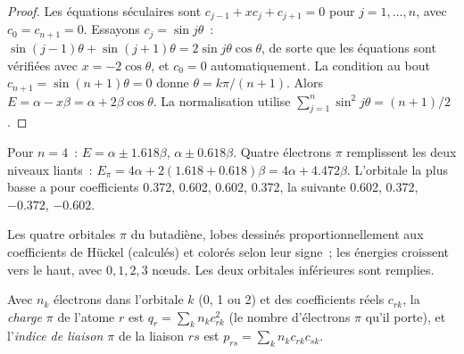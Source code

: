 \begin{proof}
Les équations séculaires sont $c_{j-1} + xc_j + c_{j+1} = 0$ pour $j = 1, \dots, n$, avec
$c_0 = c_{n+1} = 0$. Essayons $c_j = \sin j\theta$~: $\sin(j - 1)\theta + \sin(j + 1)\theta = 2\sin
j\theta\cos\theta$, de sorte que les équations sont vérifiées avec $x = -2\cos\theta$, et $c_0 = 0$
automatiquement. La condition au bout $c_{n+1} = \sin(n + 1)\theta = 0$ donne $\theta =
k\pi/(n + 1)$. Alors $E = \alpha - x\beta = \alpha + 2\beta\cos\theta$. La normalisation utilise
$\sum_{j=1}^n\sin^2 j\theta = (n + 1)/2$.
\end{proof}

\begin{example}[Le butadiène]\label{ex:b2:huckel:butadiene}
Pour $n = 4$~: $E = \alpha \pm 1.618\beta$, $\alpha \pm 0.618\beta$. Quatre électrons $\pi$ remplissent les deux
niveaux liants~: $E_\pi = 4\alpha + 2(1.618 + 0.618)\beta = 4\alpha + 4.472\beta$. L'orbitale la plus basse
a pour coefficients 0.372, 0.602, 0.602, 0.372, la suivante 0.602, 0.372,
$-0.372$, $-0.602$.
\end{example}

\begin{omfigure}

{\small Les quatre orbitales $\pi$ du butadiène, lobes dessinés proportionnellement aux
coefficients de Hückel (calculés) et colorés selon leur signe~; les énergies croissent
vers le haut, avec $0, 1, 2, 3$ nœuds. Les deux orbitales inférieures sont remplies.}
\end{omfigure}

\begin{definition}\label{def:b2:huckel:indices}
Avec $n_k$ électrons dans l'orbitale $k$ (0, 1 ou 2) et des coefficients réels $c_{rk}$, la
\emph{charge $\pi$} de l'atome $r$ est $q_r = \sum_k n_kc_{rk}^2$ (le
nombre d'électrons $\pi$ qu'il porte), et l'\emph{indice de liaison $\pi$}
de la liaison $rs$ est $p_{rs} = \sum_k n_kc_{rk}c_{sk}$.
\end{definition}


